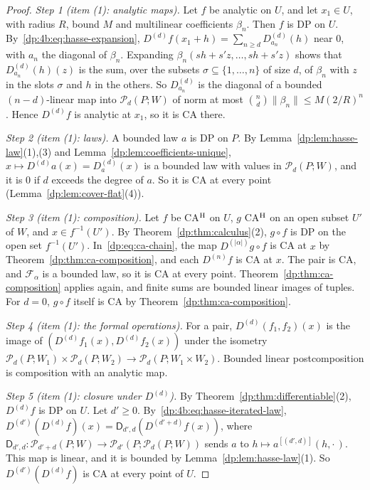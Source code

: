\documentclass[11pt]{amsart}
\theoremstyle{definition}
\theoremstyle{remark}
\numberwithin{equation}{section}
\newcommand{\abs}[1]{\lvert #1\rvert}
\newcommand{\norm}[1]{\lVert #1\rVert}
\theoremstyle{plain}
\theoremstyle{definition}
\theoremstyle{plain}
\newcommand{\cP}{\mathcal P}
\begin{document}
\begin{proof}
\emph{Step 1 (item (1): analytic maps).} Let $f$ be analytic on $U$, and let $x_1\in U$, with radius $R$, bound $M$ and multilinear coefficients $\beta_n$. Then $f$ is DP on $U$. By~\eqref{dp:4b:eq:hasse-expansion}, $D^{(d)}f(x_1+h)=\sum_{n\ge d}D^{(d)}_{a_n}(h)$ near $0$, with $a_n$ the diagonal of $\beta_n$. Expanding $\beta_n(sh+s'z,\dots,sh+s'z)$ shows that $D^{(d)}_{a_n}(h)(z)$ is the sum, over the subsets $\sigma\subseteq\{1,\dots,n\}$ of size $d$, of $\beta_n$ with $z$ in the slots $\sigma$ and $h$ in the others. So $D^{(d)}_{a_n}$ is the diagonal of a bounded $(n-d)$-linear map into $\cP_d(P;W)$ of norm at most $\binom nd\norm{\beta_n}\le M(2/R)^n$. Hence $D^{(d)}f$ is analytic at $x_1$, so it is CA there.

\emph{Step 2 (item (1): laws).} A bounded law $a$ is DP on $P$. By Lemma~\ref{dp:lem:hasse-law}(1),(3) and Lemma~\ref{dp:lem:coefficients-unique}, $x\mapsto D^{(d)}a(x)=D^{(d)}_a(x)$ is a bounded law with values in $\cP_d(P;W)$, and it is $0$ if $d$ exceeds the degree of $a$. So it is CA at every point (Lemma~\ref{dp:lem:cover-flat}(4)).

\emph{Step 3 (item (1): composition).} Let $f$ be CA$^{\rm H}$ on $U$, $g$ CA$^{\rm H}$ on an open subset $U'$ of $W$, and $x\in f^{-1}(U')$. By Theorem~\ref{dp:thm:calculus}(2), $g\circ f$ is DP on the open set $f^{-1}(U')$. In~\eqref{dp:eq:ca-chain}, the map $D^{(\abs\alpha)}g\circ f$ is CA at $x$ by Theorem~\ref{dp:thm:ca-composition}, and each $D^{(n)}f$ is CA at $x$. The pair is CA, and $\mathcal F_\alpha$ is a bounded law, so it is CA at every point. Theorem~\ref{dp:thm:ca-composition} applies again, and finite sums are bounded linear images of tuples. For $d=0$, $g\circ f$ itself is CA by Theorem~\ref{dp:thm:ca-composition}.

\emph{Step 4 (item (1): the formal operations).} For a pair, $D^{(d)}(f_1,f_2)(x)$ is the image of $(D^{(d)}f_1(x),D^{(d)}f_2(x))$ under the isometry $\cP_d(P;W_1)\times\cP_d(P;W_2)\to\cP_d(P;W_1\times W_2)$. Bounded linear postcomposition is composition with an analytic map.

\emph{Step 5 (item (1): closure under $D^{(d)}$).} By Theorem~\ref{dp:thm:differentiable}(2), $D^{(d)}f$ is DP on $U$. Let $d'\ge0$. By~\eqref{dp:4b:eq:hasse-iterated-law}, $D^{(d')}(D^{(d)}f)(x)=\mathsf D_{d',d}(D^{(d'+d)}f(x))$, where $\mathsf D_{d',d}\colon\cP_{d'+d}(P;W)\to\cP_{d'}(P;\cP_d(P;W))$ sends $a$ to $h\mapsto a^{[(d',d)]}(h,\cdot\,)$. This map is linear, and it is bounded by Lemma~\ref{dp:lem:hasse-law}(1). So $D^{(d')}(D^{(d)}f)$ is CA at every point of $U$.


\end{proof}
\end{document}
